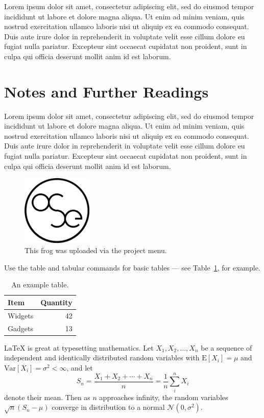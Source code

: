 \documentclass[a4paper]{article}
\begin{document}
Lorem ipsum dolor sit amet, consectetur adipiscing elit, sed do eiusmod tempor incididunt ut labore et dolore magna aliqua. Ut enim ad minim veniam, quis nostrud exercitation ullamco laboris nisi ut aliquip ex ea commodo consequat. Duis aute irure dolor in reprehenderit in voluptate velit esse cillum dolore eu fugiat nulla pariatur. Excepteur sint occaecat cupidatat non proident, sunt in culpa qui officia deserunt mollit anim id est laborum.



\section*{Notes and Further Readings}

Lorem ipsum dolor sit amet, consectetur adipiscing elit, sed do eiusmod tempor incididunt ut labore et dolore magna aliqua. Ut enim ad minim veniam, quis nostrud exercitation ullamco laboris nisi ut aliquip ex ea commodo consequat. Duis aute irure dolor in reprehenderit in voluptate velit esse cillum dolore eu fugiat nulla pariatur. Excepteur sint occaecat cupidatat non proident, sunt in culpa qui officia deserunt mollit anim id est laborum.



\begin{figure}
\centering
\includegraphics[width=0.3\textwidth]{OSE_logo2.jpg}
\caption{\label{fig:frog}This frog was uploaded via the project menu.}
\end{figure}

Use the table and tabular commands for basic tables --- see Table~\ref{tab:widgets}, for example. 

\begin{table}
\centering
\begin{tabular}{l|r}
Item & Quantity \\\hline
Widgets & 42 \\
Gadgets & 13
\end{tabular}
\caption{\label{tab:widgets}An example table.}
\end{table}

\LaTeX{} is great at typesetting mathematics. Let $X_1, X_2, \ldots, X_n$ be a sequence of independent and identically distributed random variables with $\text{E}[X_i] = \mu$ and $\text{Var}[X_i] = \sigma^2 < \infty$, and let
\[S_n = \frac{X_1 + X_2 + \cdots + X_n}{n}
      = \frac{1}{n}\sum_{i}^{n} X_i\]
denote their mean. Then as $n$ approaches infinity, the random variables $\sqrt{n}(S_n - \mu)$ converge in distribution to a normal $\mathcal{N}(0, \sigma^2)$.
\end{document}
